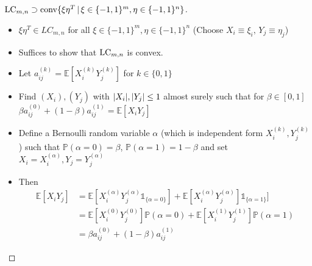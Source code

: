 \begin{frame}
	\begin{proof}[$   \textup{LC}_{m,n}  \supset \textup{conv} \{  \xi\eta^T \, | \, \xi \in \{-1,1\}^m, \eta \in \{-1,1\}^n     \} $]
		\begin{itemize}
			 \item<1-> $ \xi \eta^T \in LC_{m,n}  $ for all $\xi \in \{-1,1\}^m, \eta \in \{-1,1\}^n   $   
			 	(Choose $ X_i \equiv \xi_i, \, Y_j \equiv \eta_j $)
			\item<2-> Suffices to show that $ \textup{LC}_{m,n} $ is convex. 
			\item <3->Let $ a_{ij}^{(k)} = \mathbb{E}[X_i^{(k)}Y_{j}^{(k)}] $ for $ k \in \{0,1\} $
			\item<4-> Find $ (X_i),(Y_j) $ with $ {\left|{X_i}\right|},{\left|{Y_j}\right|} \le 1 $ almost surely such that for $ \beta \in [0,1] $
			$ 	\beta a_{ij}^{(0)}+ (1-\beta)a_{ij}^{(1)} = \mathbb{E}[X_iY_j] $ 
			\item<5-> Define a Bernoulli random variable $ \alpha $ (which is independent form $ X_i^{(k)},Y_j^{(k)} $) such that $ \mathbb{P}(\alpha = 0) = \beta $, $ \mathbb{P}(\alpha = 1) = 1 - \beta$ and set $ X_i = X_i^{(\alpha)}, Y_j = Y_j^{(\alpha)} $
			\item<6-> Then 
			\begin{align*}
			\mathbb{E}[X_iY_j] &= \mathbb{E}[X_i^{(\alpha)}Y_j^{(\alpha)}  \mathds{1}_{ \{\alpha = 0\}}] + \mathbb{E}[X_i^{(\alpha)}Y_j^{(\alpha)}]\mathds{1}_{\{\alpha = 1\}}] \\
			&=\mathbb{E}[X_i^{(0)}Y_j^{(0)}]\mathbb{P}(\alpha = 0)+ \mathbb{E}[X_i^{(1)}Y_j^{(1)}]\mathbb{P}(\alpha = 1)  \\
			&= \beta a_{ij}^{(0)}+ (1-\beta) a_{ij}^{(1)}
			\end{align*}
		\end{itemize}
	\end{proof}
\end{frame}


